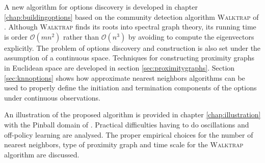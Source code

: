 A new algorithm for options discovery is developed in chapter \ref{chap:buildingoptions} based on the community detection algorithm \textsc{Walktrap} of \cite{Pons2005}. Although \textsc{Walktrap} finds its roots into spectral graph theory, its running time is order $\mathcal{O}(mn^2)$ rather than $\mathcal{O}(n^3)$ by avoiding to compute the eigenvectors explicitly. The problem of options discovery and construction is also set under the assumption of a continuous space. Techniques for constructing proximity graphs in Euclidean space are developed in section \ref{sec:proximitygraphs}. Section \ref{sec:knnoptions} shows how approximate nearest neighbors algorithms can be used to properly define the initiation and termination components of the options under continuous observations.

An illustration of the proposed algorithm is provided in chapter \ref{chap:illustration} with the Pinball domain of \cite{Konidaris2009}. Practical difficulties having to do oscillations and off-policy learning are analysed. The proper empirical choices for the number of nearest neighbors, type of proximity graph and time scale for the \textsc{Walktrap} algorithm are discussed.